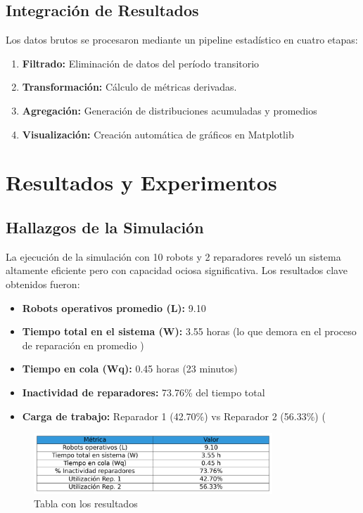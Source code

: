 \documentclass[12pt, a4paper]{article}
\begin{document}
\subsection{Integración de Resultados}
Los datos brutos se procesaron mediante un pipeline estadístico en cuatro etapas:
\begin{enumerate}
    \item \textbf{Filtrado:} Eliminación de datos del período transitorio
    \item \textbf{Transformación:} Cálculo de métricas derivadas.
    \item \textbf{Agregación:} Generación de distribuciones acumuladas y promedios
    \item \textbf{Visualización:} Creación automática de gráficos en Matplotlib
\end{enumerate}

\section{Resultados y Experimentos}
\label{sec:resultados}

\subsection{Hallazgos de la Simulación}
La ejecución de la simulación con 10 robots y 2 reparadores reveló un sistema altamente eficiente pero con capacidad ociosa significativa. Los resultados clave obtenidos fueron:
\begin{itemize}
    \item \textbf{Robots operativos promedio (L):} 9.10
    \item \textbf{Tiempo total en el sistema (W):} 3.55 horas (lo que demora en el proceso de reparación en promedio )
    \item \textbf{Tiempo en cola (Wq):} 0.45 horas (23 minutos)
    \item \textbf{Inactividad de reparadores:} 73.76\% del tiempo total
    \item \textbf{Carga de trabajo:} Reparador 1 (42.70\%) vs Reparador 2 (56.33\%) (%
\end{itemize}

\begin{figure}[h!]
    \centering
    \includegraphics[width=0.8\textwidth]{../img/tabla_resultados.png}
    \caption{Tabla con los resultados}
    \label{fig:ejemplo}
\end{figure}
\end{document}
